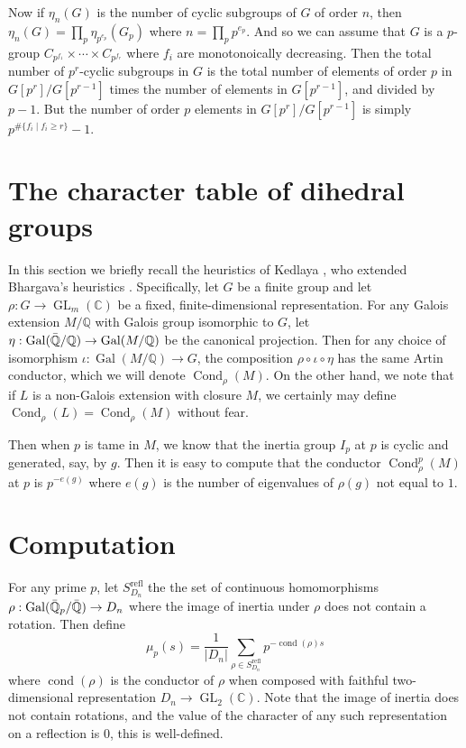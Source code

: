 \documentclass[11pt]{article}
\newcommand{\Gal}{\operatorname{Gal}}
\newcommand{\GL}{\operatorname{GL}}
\newcommand{\Qbar}{\Bar{\mathbb{Q}}}
\newcommand{\Cond}{\operatorname{Cond}}
\newcommand{\cond}{\operatorname{cond}}
\newcommand{\refl}{\mathrm{refl}}
\newcommand{\C}{\mathbb{C}}
\newcommand{\Q}{\mathbb{Q}}
\theoremstyle{definition}
\begin{document}
Now if $\eta_n(G)$ is the number of cyclic subgroups of $G$ of order $n$, then
$\eta_n(G) = \prod_p \eta_{p^{e_p}}(G_p)$ where $n = \prod_p p^{e_p}$. And so
we can assume that $G$ is a $p$-group $C_{p^{f_1}} \times \cdots \times
C_{p^{f_r}}$ where $f_i$ are monotonoically decreasing. Then the total number
of $p^r$-cyclic subgroups in $G$ is the total number of elements of order $p$
in $G[p^r]/G[p^{r-1}]$ times the number of elements in $G[p^{r-1}]$,
and divided by $p - 1$.  But the number of order $p$ elements in
$G[p^r]/G[p^{r-1}]$ is simply $p^{\# \{ f_i \mid f_i \geq r\}} - 1$.



\section{The character table of dihedral groups}

In this section we briefly recall the heuristics of Kedlaya \cite{kedlayamass},
who extended Bhargava's heuristics \cite{bhargavamass}. Specifically, let $G$
be a finite group and let $\rho : G \to \GL_m(\C)$ be a fixed,
finite-dimensional representation. For any Galois extension $M/\Q$ with Galois
group isomorphic to $G$, let $\eta : \Gal(\Qbar/\Q) \to \Gal(M/\Q)$ be the
canonical projection. Then for any choice of isomorphism $\iota: \Gal(M/\Q) \to
G$, the composition $\rho \circ \iota \circ \eta$ has the same Artin conductor,
which we will denote $\Cond_\rho(M)$. On the other hand, we note that if $L$ is
a non-Galois extension with closure $M$, we certainly may define $\Cond_\rho(L)
= \Cond_\rho(M)$ without fear.

Then when $p$ is tame in $M$, we know that the inertia group $I_p$ at $p$ is
cyclic and generated, say, by $g$. Then it is easy to compute that the
conductor $\Cond_\rho^p(M)$ at $p$ is $p^{-e(g)}$ where $e(g)$ is the number of
eigenvalues of $\rho(g)$ not equal to $1$.


\section{Computation}

For any prime $p$, let $S_{D_n}^{\refl}$ the the set of continuous homomorphisms
$\rho : \Gal(\Qbar_p/\Qbar) \to D_n$ where the image of inertia under $\rho$ does not contain a rotation. Then define
\[ \mu_p(s) = \frac{1}{|D_n|} \sum_{\rho \in S_{D_n}^\refl} p^{-\cond(\rho)s} \]
where $\cond(\rho)$ is the conductor of $\rho$ when composed with faithful
two-dimensional representation $D_n \to \GL_2(\C)$. Note that the image of
inertia does not contain rotations, and the value of the character of any such
representation on a reflection is $0$, this is well-defined.
\end{document}

